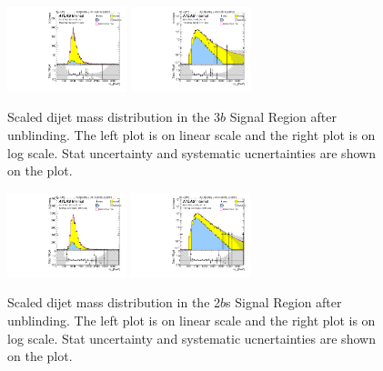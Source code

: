 \begin{figure}[htbp!]
\begin{center}
\includegraphics[width=0.31\textwidth,angle=-90]{figures/boosted/Signal_Syst/Moriond_bkg_9_ThreeTag_Signal_mHH_pole.pdf}
\includegraphics[width=0.31\textwidth,angle=-90]{figures/boosted/Signal_Syst/Moriond_bkg_9_ThreeTag_Signal_mHH_pole_1.pdf}  
  \caption{Scaled dijet mass distribution in the 3$b$ Signal Region after unblinding. The left plot is on linear scale and the right plot is on log scale. Stat uncertainty and systematic ucnertainties are shown on the plot.}
  \label{fig:boosted-3b-signal-pole}
\end{center}
\end{figure}

\begin{figure}[htbp!]
\begin{center}
\includegraphics[width=0.31\textwidth,angle=-90]{figures/boosted/Signal_Syst/Moriond_bkg_9_TwoTag_split_Signal_mHH_pole.pdf}
\includegraphics[width=0.31\textwidth,angle=-90]{figures/boosted/Signal_Syst/Moriond_bkg_9_TwoTag_split_Signal_mHH_pole_1.pdf}  
  \caption{Scaled dijet mass distribution in the 2$b$s Signal Region after unblinding. The left plot is on linear scale and the right plot is on log scale. Stat uncertainty and systematic ucnertainties are shown on the plot.}
  \label{fig:boosted-2b-signal-pole}
\end{center}
\end{figure}

